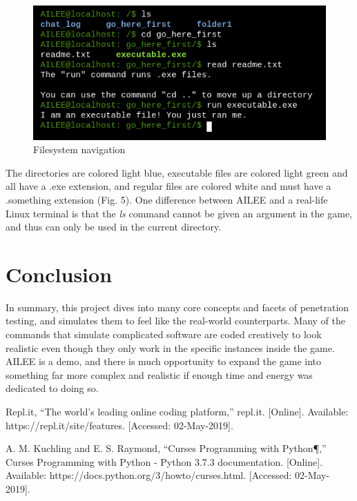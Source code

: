 \documentclass[conference]{IEEEtran}
\begin{document}
\begin{figure}[htbp]
	\centerline{\includegraphics[scale=2]{filesystem-example}}
	\caption{Filesystem navigation}
	\label{fig}
\end{figure}

The directories are colored light blue, executable files are colored light green and all have a .exe extension, and regular files are colored white and must have a .something extension (Fig. 5). One difference between AILEE and a real-life Linux terminal is that the \textit{ls} command cannot be given an argument in the game, and thus can only be used in the current directory.

\section{Conclusion}
In summary, this project dives into many core concepts and facets of penetration testing, and simulates them to feel like the real-world counterparts. Many of the commands that simulate complicated software are coded creatively to look realistic even though they only work in the specific instances inside the game. AILEE is a demo, and there is much opportunity to expand the game into something far more complex and realistic if enough time and energy was dedicated to doing so.

\begin{thebibliography}{00}
 Repl.it, “The world's leading online coding platform,” repl.it. [Online]. Available: https://repl.it/site/features. [Accessed: 02-May-2019].

 A. M. Kuchling and E. S. Raymond, “Curses Programming with Python¶,” Curses Programming with Python - Python 3.7.3 documentation. [Online]. Available: https://docs.python.org/3/howto/curses.html. [Accessed: 02-May-2019].

\end{thebibliography}
\end{document}
